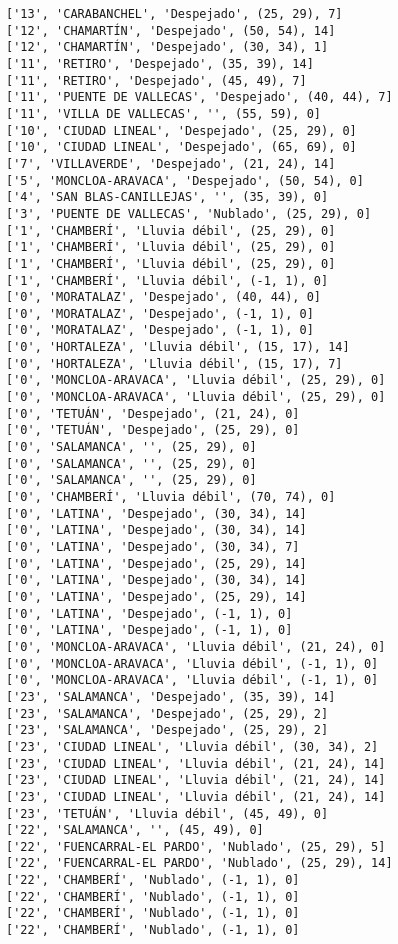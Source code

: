 \documentclass[11pt]{article}
\begin{document}
\begin{Verbatim}[commandchars=\\\{\}]
['13', 'CARABANCHEL', 'Despejado', (25, 29), 7]
['12', 'CHAMARTÍN', 'Despejado', (50, 54), 14]
['12', 'CHAMARTÍN', 'Despejado', (30, 34), 1]
['11', 'RETIRO', 'Despejado', (35, 39), 14]
['11', 'RETIRO', 'Despejado', (45, 49), 7]
['11', 'PUENTE DE VALLECAS', 'Despejado', (40, 44), 7]
['11', 'VILLA DE VALLECAS', '', (55, 59), 0]
['10', 'CIUDAD LINEAL', 'Despejado', (25, 29), 0]
['10', 'CIUDAD LINEAL', 'Despejado', (65, 69), 0]
['7', 'VILLAVERDE', 'Despejado', (21, 24), 14]
['5', 'MONCLOA-ARAVACA', 'Despejado', (50, 54), 0]
['4', 'SAN BLAS-CANILLEJAS', '', (35, 39), 0]
['3', 'PUENTE DE VALLECAS', 'Nublado', (25, 29), 0]
['1', 'CHAMBERÍ', 'Lluvia débil', (25, 29), 0]
['1', 'CHAMBERÍ', 'Lluvia débil', (25, 29), 0]
['1', 'CHAMBERÍ', 'Lluvia débil', (25, 29), 0]
['1', 'CHAMBERÍ', 'Lluvia débil', (-1, 1), 0]
['0', 'MORATALAZ', 'Despejado', (40, 44), 0]
['0', 'MORATALAZ', 'Despejado', (-1, 1), 0]
['0', 'MORATALAZ', 'Despejado', (-1, 1), 0]
['0', 'HORTALEZA', 'Lluvia débil', (15, 17), 14]
['0', 'HORTALEZA', 'Lluvia débil', (15, 17), 7]
['0', 'MONCLOA-ARAVACA', 'Lluvia débil', (25, 29), 0]
['0', 'MONCLOA-ARAVACA', 'Lluvia débil', (25, 29), 0]
['0', 'TETUÁN', 'Despejado', (21, 24), 0]
['0', 'TETUÁN', 'Despejado', (25, 29), 0]
['0', 'SALAMANCA', '', (25, 29), 0]
['0', 'SALAMANCA', '', (25, 29), 0]
['0', 'SALAMANCA', '', (25, 29), 0]
['0', 'CHAMBERÍ', 'Lluvia débil', (70, 74), 0]
['0', 'LATINA', 'Despejado', (30, 34), 14]
['0', 'LATINA', 'Despejado', (30, 34), 14]
['0', 'LATINA', 'Despejado', (30, 34), 7]
['0', 'LATINA', 'Despejado', (25, 29), 14]
['0', 'LATINA', 'Despejado', (30, 34), 14]
['0', 'LATINA', 'Despejado', (25, 29), 14]
['0', 'LATINA', 'Despejado', (-1, 1), 0]
['0', 'LATINA', 'Despejado', (-1, 1), 0]
['0', 'MONCLOA-ARAVACA', 'Lluvia débil', (21, 24), 0]
['0', 'MONCLOA-ARAVACA', 'Lluvia débil', (-1, 1), 0]
['0', 'MONCLOA-ARAVACA', 'Lluvia débil', (-1, 1), 0]
['23', 'SALAMANCA', 'Despejado', (35, 39), 14]
['23', 'SALAMANCA', 'Despejado', (25, 29), 2]
['23', 'SALAMANCA', 'Despejado', (25, 29), 2]
['23', 'CIUDAD LINEAL', 'Lluvia débil', (30, 34), 2]
['23', 'CIUDAD LINEAL', 'Lluvia débil', (21, 24), 14]
['23', 'CIUDAD LINEAL', 'Lluvia débil', (21, 24), 14]
['23', 'CIUDAD LINEAL', 'Lluvia débil', (21, 24), 14]
['23', 'TETUÁN', 'Lluvia débil', (45, 49), 0]
['22', 'SALAMANCA', '', (45, 49), 0]
['22', 'FUENCARRAL-EL PARDO', 'Nublado', (25, 29), 5]
['22', 'FUENCARRAL-EL PARDO', 'Nublado', (25, 29), 14]
['22', 'CHAMBERÍ', 'Nublado', (-1, 1), 0]
['22', 'CHAMBERÍ', 'Nublado', (-1, 1), 0]
['22', 'CHAMBERÍ', 'Nublado', (-1, 1), 0]
['22', 'CHAMBERÍ', 'Nublado', (-1, 1), 0]

\end{Verbatim}
\end{document}
